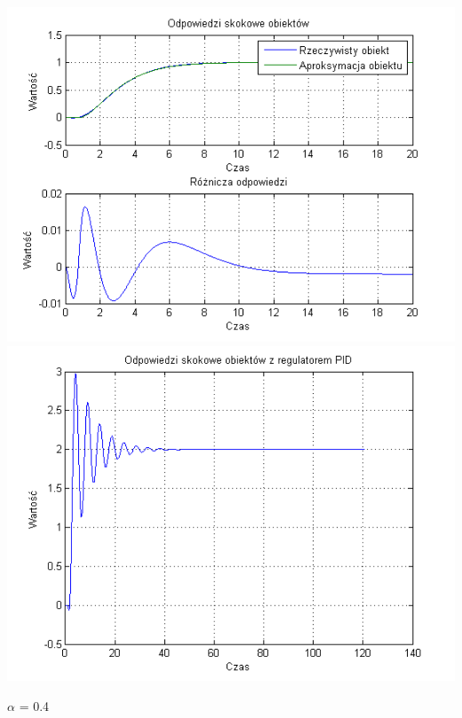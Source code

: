 \documentclass[10pt,a4paper]{article}
\begin{document}
\begin{center}
\includegraphics[scale=1]{images/dwa/skrypt_229.png}\\
\includegraphics[scale=1]{images/dwa/skrypt_230.png}\\
\end{center}
\newpage
$\alpha$ = 0.4
\end{document}
